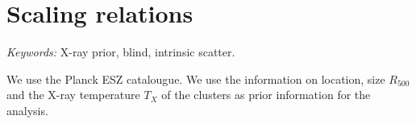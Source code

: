 \section{Scaling relations}
\textit{Keywords:} X-ray prior, blind, intrinsic scatter.

We use the Planck ESZ catalougue. We use the information on location, size $R_{500}$ and the X-ray temperature $T_X$ of the clusters as prior information for the analysis.